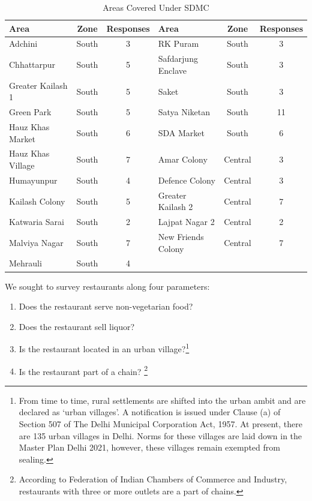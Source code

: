 \documentclass[a4paper, 12pt]{article}
\begin{document}
		\begin{table}[H]
			\caption{Areas Covered Under SDMC}
			\begin{tabular}{ l  c  c l   c  c}
			\toprule
			Area & Zone & Responses & Area & Zone & Responses \\
			\midrule
				Adchini 			&	South		&	3				&	RK Puram			&	South	&	3	\\
				Chhattarpur		&	South		&	5				&	Safdarjung Enclave	&	South	&	3	\\
				Greater Kailash 1	&	South		&	5				&	Saket			&	South	&	3	\\
				Green Park		&	South		&	5				&	Satya Niketan		&	South	&	11	\\
				Hauz Khas Market	&	South		&	6				&	SDA Market		&	South	&	6	\\
				Hauz Khas Village	&	South		&	7				&	Amar Colony		&	Central	&	3	\\
				Humayunpur		&	South		&	4				&	Defence Colony	&	Central	&	3	\\
				Kailash Colony		&	South		&	5				&	Greater Kailash 2	&	Central	&	7	\\
				Katwaria Sarai		&	South		&	2				&	Lajpat Nagar 2		&	Central	&	2	\\
				Malviya Nagar		&	South		&	7				&	New Friends Colony	&	Central	&	7	\\
				Mehrauli			&	South		&	4	\\	
				\bottomrule					
			\end{tabular}
		\end{table}    
   		
		
		
		We sought to survey restaurants along four parameters:
		\begin{enumerate}[nosep]
			\item Does the restaurant serve non-vegetarian food?
			\item Does the restaurant sell liquor?
			\item Is the restaurant located in an urban village?\footnote{From time to time, rural settlements are shifted into the urban ambit and are declared as ‘urban villages’. A notification is issued under Clause (a) of Section 507 of The Delhi Municipal 
Corporation Act, 1957. At present, there are 135 urban villages in Delhi. Norms for these villages are laid down in the Master Plan Delhi 2021, however, these villages remain exempted from sealing.} 
			\item Is the restaurant part of a chain? \footnote{According to Federation of Indian Chambers of Commerce and Industry, restaurants with three or more outlets are a part of chains.}
		\end{enumerate}
\end{document}
